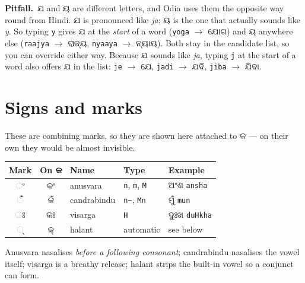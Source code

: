 \documentclass[11pt, a4paper]{article}
\newcommand{\od}[1]{{\odiafont #1}}          %
\newcommand{\odb}[1]{{\odiafont\large #1}}   %
\newcommand{\kpit}{{\color{midseaorange!85!black}\textbf{\textsf{Pitfall.}}}\ }
\begin{document}
\begin{warnbox}
\kpit \od{ଯ} and \od{ୟ} are different letters, and Odia uses them the opposite way round
from Hindi. \od{ଯ} is pronounced like \emph{ja}; \od{ୟ} is the one that actually sounds
like \emph{y}. So typing \texttt{y} gives \od{ଯ} at the \emph{start} of a word
(\texttt{yoga} \(\rightarrow\) \od{ଯୋଗ}) and \od{ୟ} anywhere else
(\texttt{raajya} \(\rightarrow\) \od{ରାଜ୍ୟ}, \texttt{nyaaya} \(\rightarrow\) \od{ନ୍ୟାୟ}).
Both stay in the candidate list, so you can override either way.
Because \od{ଯ} sounds like \emph{ja}, typing \texttt{j} at the start of a word also
offers \od{ଯ} in the list: \texttt{je} \(\rightarrow\) \od{ଯେ},
\texttt{jadi} \(\rightarrow\) \od{ଯଦି}, \texttt{jiba} \(\rightarrow\) \od{ଯିବା}.
\end{warnbox}

\section{Signs and marks}

These are combining marks, so they are shown here attached to \od{କ} --- on their own
they would be almost invisible.

\begin{center}
\begin{tabular}{c c l l l}
\toprule
Mark & On \od{କ} & Name & Type & Example \\
\midrule
\odb{ଂ} & \odb{କଂ} & anusvara     & \texttt{n}, \texttt{m}, \texttt{M} & \od{ଅଂଶ} \texttt{ansha} \\
\odb{ଁ} & \odb{କଁ} & candrabindu  & \texttt{n\textasciitilde}, \texttt{Mn} & \od{ମୁଁ} \texttt{mun} \\
\odb{ଃ} & \odb{କଃ} & visarga      & \texttt{H}                         & \od{ଦୁଃଖ} \texttt{duHkha} \\
\odb{୍}  & \odb{କ୍} & halant       & automatic                          & see below \\
\bottomrule
\end{tabular}
\end{center}

Anusvara nasalises \emph{before a following consonant}; candrabindu nasalises the vowel
itself; visarga is a breathy release; halant strips the built-in vowel so a conjunct can
form.

\end{document}
